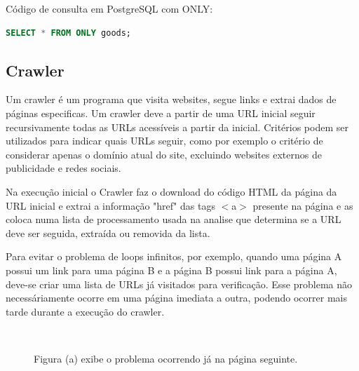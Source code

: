 \documentclass[12pt]{article}
\begin{document}
Código de consulta em PostgreSQL com ONLY:

\begin{lstlisting}[language=SQL,morekeywords={only}]
SELECT * FROM ONLY goods;
\end{lstlisting}

\subsection{Crawler}

Um crawler é um programa que visita websites, segue links e extrai dados de páginas especificas. Um crawler deve a partir de uma URL inicial seguir recursivamente todas as URLs acessíveis a partir da inicial. Critérios podem ser utilizados para indicar quais URLs seguir, como por exemplo o critério de considerar apenas o domínio atual do site, excluindo websites externos de publicidade e redes sociais.

Na execução inicial o Crawler faz o download do código HTML da página da URL inicial e extrai a informação "href" das tags $<$a$>$ presente na página e as coloca numa lista de processamento usada na analise que determina se a URL deve ser seguida, extraída ou removida da lista. 

Para evitar o problema de loops infinitos, por exemplo, quando uma página A possui um link para uma página B e a página B possui link para a página A, deve-se criar uma lista de URLs já visitados para verificação. Esse problema não necessáriamente ocorre em uma página imediata a outra, podendo ocorrer mais tarde durante a execução do crawler.  

\begin{figure}[H]
\centering
\mbox{\quad
{}}
\caption{Figura (a) exibe o problema ocorrendo já na página seguinte.}
\label{fig6}
\end{figure}
\end{document}
